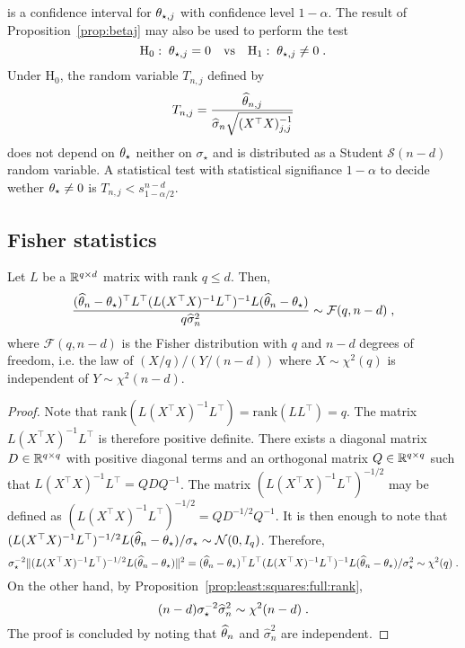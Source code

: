  is a confidence interval for $\theta_{\star,j}$ with confidence level $1-\alpha$. The result of Proposition~\ref{prop:betaj} may also be used to perform the test 
\[
\mathrm{H}_0:\; \theta_{\star,j} = 0 \quad\mathrm{vs} \quad \mathrm{H}_1:\; \theta_{\star,j} \neq 0\;.
\]
Under $\mathrm{H}_0$, the random variable $T_{n,j}$ defined by 
\[
T_{n,j} = \frac{\widehat {\theta}_{n,j}}{\widehat\sigma_{n}\sqrt{(X^\top X)_{j,j}^{-1}}} 
\] 
does not depend  on $\theta_{\star}$ neither on $\sigma_{\star}$ and is distributed as a Student $\mathcal{S}(n-d)$ random variable. A statistical test with statistical signifiance $1-\alpha$ to decide wether $\theta_{\star}\neq 0$ is $T_{n,j}<s_{1-\alpha/2}^{n-d}$. 
\subsection*{Fisher statistics}
\begin{shaded}
\begin{proposition}
\label{prop:Lbeta}
Let $L$ be a $\mathbb{R}^{q\times d}$ matrix with rank $q\leqslant d$. Then,
\[
\frac{(\widehat {\theta}_{n} -\theta_{\star})^\top L^\top(L(X^\top X)^{-1}L^\top)^{-1}L(\widehat {\theta}_{n} -\theta_{\star})}{q\widehat\sigma^2_{n}} \sim \mathcal{F}(q,n-d)\;,
\]
where $\mathcal{F}(q,n-d)$ is the Fisher distribution with $q$ and $n-d$ degrees of freedom, i.e. the law of $(X/q)/(Y/(n-d))$ where $X\sim\chi^2(q)$ is independent of $Y\sim\chi^2(n-d)$.
\end{proposition}
\end{shaded}
\begin{proof}
Note that $\mathrm{rank}(L(X^\top X)^{-1}L^\top) = \mathrm{rank}(LL^\top)  = q$. The matrix $L(X^\top X)^{-1}L^\top$ is therefore positive definite. There exists a diagonal matrix $D\in\mathbb{R}^{q\times q}$ with positive diagonal terms and an orthogonal matrix $Q\in\mathbb{R}^{q\times q}$ such that $L(X^\top X)^{-1}L^\top = QDQ^{-1}$. The matrix $(L(X^\top X)^{-1}L^\top)^{-1/2}$ may be defined as $(L(X^\top X)^{-1}L^\top)^{-1/2} = QD^{-1/2}Q^{-1}$. It is then enough to note that $(L(X^\top X)^{-1}L^\top)^{-1/2}L(\widehat {\theta}_{n} -\theta_{\star})/\sigma_{\star}\sim \mathcal{N}(0,I_q)$. Therefore,
\[
\sigma^{-2}_{\star}\|(L(X^\top X)^{-1}L^\top)^{-1/2}L(\widehat {\theta}_{n} -\theta_{\star})\|^2 = (\widehat {\theta}_{n} -\theta_{\star})^\top L^\top(L(X^\top X)^{-1}L^\top)^{-1}L(\widehat {\theta}_{n} -\theta_{\star})/\sigma^2_{\star} \sim \chi^2(q)\;.
\]
On the other hand, by Proposition~\ref{prop:least:squares:full:rank}, 
\[
(n-d)\sigma^{-2}_{\star}\widehat\sigma^2_{n} \sim \chi^2(n-d)\;.
\]
The proof is concluded by noting that $\widehat {\theta}_n$ and  $\widehat\sigma^2_{n}$ are independent.
\end{proof}
